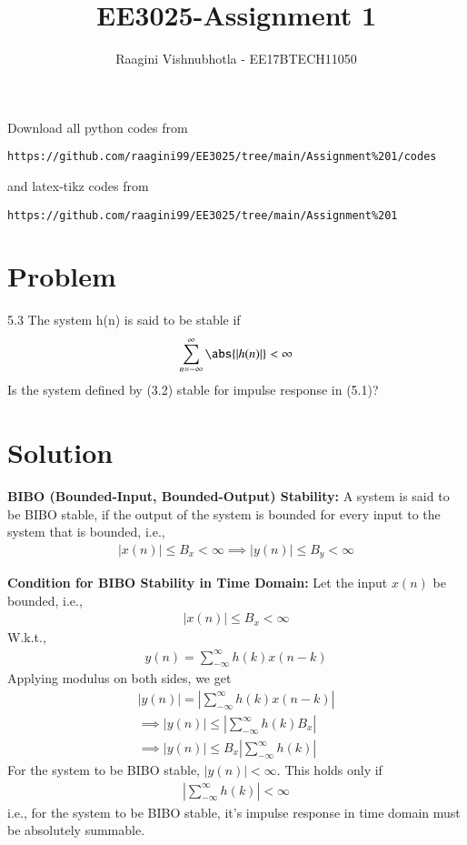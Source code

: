 \documentclass[journal,12pt,twocolumn]{IEEEtran}
\begin{document}
\def\rightbox#1{\makebox[0in][r]{#1}}
\def\centbox#1{\makebox[0in]{#1}}
\def\topbox#1{\raisebox{-\baselineskip}[0in][0in]{#1}}
\def\midbox#1{\raisebox{-0.5\baselineskip}[0in][0in]{#1}}
\vspace{3cm}
\title{EE3025-Assignment 1}
\author{Raagini Vishnubhotla - EE17BTECH11050}
\maketitle
\newpage
\bigskip
\renewcommand{\thefigure}{\theenumi}
\renewcommand{\thetable}{\theenumi}
Download all python codes from 
\begin{lstlisting}
https://github.com/raagini99/EE3025/tree/main/Assignment%201/codes
\end{lstlisting}
%
and latex-tikz codes from 
%
\begin{lstlisting}
https://github.com/raagini99/EE3025/tree/main/Assignment%201
\end{lstlisting}
\section{Problem}
5.3 The system h(n) is said to be stable if 
\begin{align}
\sum_{n=-\infty}^{\infty} \abs{|h(n)|} < \infty
\end{align} 
Is the system defined by (3.2) stable for impulse response in (5.1)?
\section{Solution}

\textbf{BIBO (Bounded-Input, Bounded-Output) Stability:}
A system is said to be BIBO stable, if the output of the system is bounded for every input to the system that is bounded, i.e.,
\begin{align}
    |x(n)|\leq B_x<\infty \implies |y(n)| \leq B_y<\infty
\end{align}

\textbf{Condition for BIBO Stability in Time Domain:}
Let the input $x(n)$ be bounded, i.e.,\\
\begin{align}
    |x(n)|\leq B_x<\infty
\end{align}
W.k.t.,\\
\begin{align}
    y(n)=\sum_{-\infty}^{\infty}h(k)x(n-k)
\end{align}
Applying modulus on both sides, we get\\
\begin{align}
    |y(n)|=|\sum_{-\infty}^{\infty}h(k)x(n-k)|\\
    \implies |y(n)| \leq |\sum_{-\infty}^{\infty}h(k) B_x|\\
    \implies |y(n)| \leq B_x|\sum_{-\infty}^{\infty}h(k)|
\end{align}
For the system to be BIBO stable, $|y(n)| < \infty$. This holds only if 
\begin{align}
    |\sum_{-\infty}^{\infty}h(k)| < \infty
\end{align}
i.e., for the system to be BIBO stable, it's impulse response in time domain must be absolutely summable.  
\\
\end{document}
